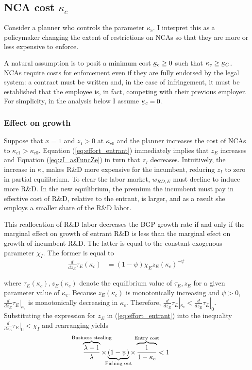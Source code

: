 \documentclass[11pt,english]{article}
\newcommand\munderbar[1]{%
	\underaccent{\bar}{#1}}
\theoremstyle{remark}
\begin{document}
\subsection{NCA cost $\kappa_c$} 

Consider a planner who controls the parameter $\kappa_c$. I interpret this as a policymaker changing the extent of restrictions on NCAs so that they are more or less expensive to enforce. 

A natural assumption is to posit a minimum cost $\munderbar{\kappa}_c \ge 0$ such that $\kappa_c \ge \munderbar{\kappa}_C$. NCAs require costs for enforcement even if they are fully endorsed by the legal system: a contract must be written and, in the case of infringement, it must be established that the employee is, in fact, competing with their previous employer. For simplicity, in the analysis below I assume $\munderbar{\kappa}_c = 0$.

\subsubsection{Effect on growth}

Suppose that $x = 1$ and $z_I > 0$ at $\kappa_{c0}$ and the planner increases the cost of NCAs to $\kappa_{c1} > \kappa_{c0}$. Equation (\ref{eq:effort_entrant}) immediately implies that $z_E$ increases and Equation (\ref{eq:zI_asFuncZe}) in turn that $z_I$ decreases. Intuitively, the increase in $\kappa_c$ makes R\&D more expensive for the incumbent, reducing $z_I$ to zero in partial equilibrium. To clear the labor market, $w_{RD,E}$ must decline to induce more R\&D. In the new equilibrium, the premium the incumbent must pay in effective cost of R\&D, relative to the entrant, is larger, and as a result she employs a smaller share of the R\&D labor.

This reallocation of R\&D labor decreases the BGP growth rate if and only if the marginal effect on growth of entrant R\&D is less than the marginal efect on growth of incumbent R\&D. The latter is equal to the constant exogenous parameter $\chi_I$. The former is equal to 
\begin{align}
\frac{d}{dz_E} \tau_E(\kappa_c) &= (1-\psi) \chi_E z_E (\kappa_c)^{-\psi} \label{eq:marginal_effect_effort_entrant}
\end{align}

where $\tau_E(\kappa_c), z_E(\kappa_c)$ denote the equilibrium value of $\tau_E, z_E$ for a given parameter value of $\kappa_c$. Because $z_E(\kappa_c)$ is monotonically increasing and $\psi > 0$, $\frac{d}{dz_E} \tau_E |_{\kappa_c}$ is monotonically decreasing in $\kappa_c$. Therefore, $\frac{d}{dz_E}\tau_E |_{\kappa_c} < \frac{d}{dz_E}\tau_E|_0$. Substituting the expression for $z_E$ in (\ref{eq:effort_entrant}) into the inequality $\frac{d}{dz_E}\tau_E |_{0}< \chi_I$ and rearranging yields 
\begin{align}
\overbrace{\frac{\lambda-1}{\lambda}}^{\mathclap{\text{Business stealing}}} \times \underbrace{(1-\psi)}_{\mathclap{\text{Fishing out}}} \times  \overbrace{\frac{1}{1-\kappa_{e}}}^{\mathclap{\text{Entry cost}}}< 1 \label{cs:growth_decreasing_condition}
\end{align}
\end{document}
